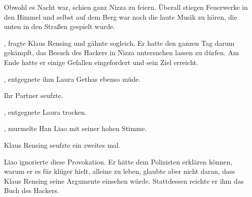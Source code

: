 \par

Obwohl es Nacht war, schien ganz Nizza zu feiern. Überall stiegen Feuerwerke in den Himmel und selbst auf dem Berg war noch die laute Musik zu hören, die unten in den Straßen gespielt wurde.

\par

, fragte Klaus Rensing und gähnte sogleich. Er hatte den ganzen Tag darum gekämpft, das Besuch des Hackers in Nizza untersuchen lassen zu dürfen. Am Ende hatte er einige Gefallen eingefordert und sein Ziel erreicht.

\par

, entgegnete ihm Laura Gethas ebenso müde. 

\par

Ihr Partner seufzte. 

\par

, entgegnete Laura trocken.

\par

, murmelte Han Liao mit seiner hohen Stimme. 

\par

Klaus Rensing seufzte ein zweites mal. 

\par

Liao ignorierte diese Provokation. Er hätte dem Polizisten erklären können, warum er es für klüger hielt, alleine zu leben, glaubte aber nicht daran, dass Klaus Rensing seine Argumente einsehen würde. Stattdessen reichte er ihm das Buch des Hackers.

\par


